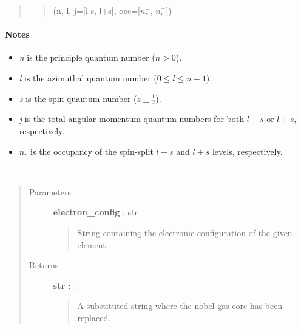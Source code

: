 \documentclass[letterpaper,10pt,english]{sphinxmanual}
\begin{document}
\begin{fulllineitems}
\begin{fulllineitems}
\begin{quote}
\begin{description}
\begin{quote}
(n, l, j={[}l-s, l+s{]}, occ={[}$n^-_r$, $n^+_r${]})
\end{quote}

\end{description}\end{quote}
\paragraph{Notes}
\begin{itemize}
\item {} 
\emph{n} is the principle quantum number ($n > 0$).

\item {} 
\emph{l} is the azimuthal quantum number ($0 \leq l \leq n-1$).

\item {} 
\emph{s} is the spin quantum number ($s \pm \frac{1}{2}$).

\item {} 
\emph{j} is the total angular momentum quantum numbers for both 
$l-s$ or $l+s$, respectively.

\item {} 
$n_r$ is the occupancy of the spin-split $l-s$ 
and $l+s$ levels, respectively.

\end{itemize}

\end{fulllineitems}


\begin{fulllineitems}
\label{modules:phaseshifts.atorb.Atorb.replace_core_config}~\begin{quote}\begin{description}
\item[{Parameters}] \leavevmode
\textbf{electron\_config} : str
\begin{quote}

String containing the electronic configuration of the given 
element.
\end{quote}

\item[{Returns}] \leavevmode
\textbf{str :} :
\begin{quote}

A substituted string where the nobel gas core has been replaced.
\end{quote}


\end{description}
\end{quote}
\end{fulllineitems}
\end{fulllineitems}
\end{document}
